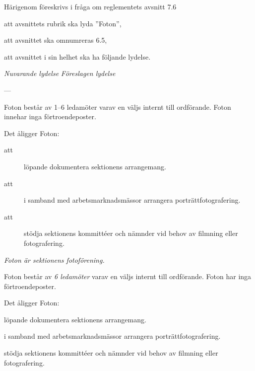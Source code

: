 \documentclass{article}
\newenvironment{lydelse}
    {\begin{paracol}{2}%
        \emph{Nuvarande lydelse}%
        \switchcolumn%
        \emph{Föreslagen lydelse}%
    \end{paracol}%
    \begin{enumerate}[label=\thesubsection.\arabic*]%
    \begin{paracol}{2}%
    }{\end{paracol}\end{enumerate}}
\begin{document}
Härigenom föreskrivs i fråga om reglementets avsnitt 7.6

\begin{dels}
    \item att avsnittets rubrik ska lyda ''Foton'',
    \item att avsnittet ska omnumreras 6.5,
    \item att avsnittet i sin helhet ska ha följande lydelse.
\end{dels}

\begin{lydelse}
    
    \setcounter{section}{7}
    \setcounter{subsection}{6}
    
    \item[] ---
    
    \item Foton består av 1--6 ledamöter varav en väljs internt till ordförande. Foton innehar inga förtroendeposter.
	
	\item Det åligger Foton:
	\begin{description}
		\item[att] löpande dokumentera sektionens arrangemang.
		\item[att] i samband med arbetsmarknadsmässor arrangera porträttfotografering.
		\item[att] stödja sektionens kommittéer och nämnder vid behov av filmning eller fotografering.
	\end{description}
		
    \setcounter{section}{6}
    \setcounter{subsection}{5}
    
    \switchcolumn
    
    \item \emph{Foton är sektionens fotoförening.}

    \item Foton består av \emph{6 ledamöter} varav en väljs internt till ordförande. Foton har inga förtroendeposter.
    
    \vspace{1.2em}
    \item Det åligger Foton:
    \begin{aligganden}
        \vspace{-0.2em}
        \item löpande dokumentera sektionens arrangemang.\vspace{0.2em}
        \item i samband med arbetsmarknadsmässor arrangera porträttfotografering.\vspace{0.2em}
        \item stödja sektionens kommittéer och nämnder vid behov av filmning eller fotografering.
    \end{aligganden}
    
\end{lydelse}
\end{document}
